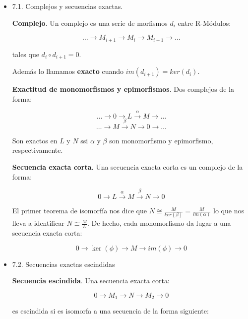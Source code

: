 \documentclass[11pt]{article}
\begin{document}
\begin{itemize}
\item 7.1. Complejos y secuencias exactas.
\label{sec-4-1-1-1}
\begin{definition}
\textbf{Complejo}. Un complejo es una serie de morfismos $d_i$ entre R-Módulos:

\[\dots \longrightarrow M_{i+1} \longrightarrow M_i \longrightarrow M_{i-1} \longrightarrow \dots\]

tales que $d_i \circ d_{i+1} = 0$.
\end{definition}

Además lo llamamos \textbf{exacto} cuando $im (d_{i+1}) = ker (d_i)$.

\begin{proposition}
\textbf{Exactitud de monomorfismos y epimorfismos}. Dos complejos de la forma:

\[ \dots \longrightarrow 0 \longrightarrow L \overset{\alpha}\longrightarrow M \longrightarrow \dots \]
\[ \dots \longrightarrow M \overset{\beta} \longrightarrow N \longrightarrow 0 \longrightarrow \dots \]

Son exactos en $L$ y $N$ ssi $\alpha$ y $\beta$ son monomorfismo y epimorfismo, 
respectivamente.
\end{proposition}

\begin{definition}
\textbf{Secuencia exacta corta}. Una secuencia exacta corta es un complejo de la forma:

\[ 0 \longrightarrow L \overset{\alpha}\longrightarrow M \overset{\beta}\longrightarrow N \longrightarrow 0 \]
\end{definition}

El primer teorema de isomorfía nos dice que $N \cong \frac{M}{ker(\beta)} = \frac{M}{im(\alpha)}$ lo que nos 
lleva a identificar   $N \cong \frac{M}{L}$. De hecho, cada monomorfismo da lugar a una 
secuencia exacta corta:

\[ 0 \longrightarrow \ker(\phi) \longrightarrow M \longrightarrow im(\phi) \longrightarrow 0 \]

\item 7.2. Secuencias exactas escindidas
\label{sec-4-1-1-2}
\begin{definition}
\textbf{Secuencia escindida}. Una secuencia exacta corta:

\[ 0 \longrightarrow M_1 \longrightarrow N \longrightarrow M_2 \longrightarrow 0 \]

es escindida si es isomorfa a una secuencia de la forma siguiente:


\end{definition}
\end{itemize}
\end{document}
